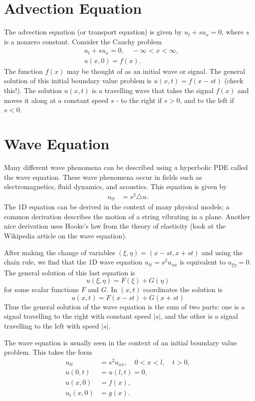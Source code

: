 \label{lab:waveeqn}

\section*{Advection Equation}
The advection equation (or transport equation) is given by $u_t + s u_x = 0$, where $s$ is a nonzero constant.  
Consider the Cauchy problem 
\begin{align*}
	& u_t + su_x = 0, \quad -\infty < x < \infty,\\\
	& u(x,0) = f(x).
\end{align*}
The function $f(x)$ may be thought of as an initial wave or signal.
The general solution of this initial boundary value problem is $u(x,t) = f(x-st)$ (check this!).
The solution $u(x,t)$ is a travelling wave that takes the signal $f(x)$ and moves it along at a constant speed $s$ - to the right if $s > 0$, and to the left if $s < 0$. 

\section*{Wave Equation}
Many different wave phenomena can be described using a hyperbolic PDE called the wave equation. 
These wave phenomena occur in fields such as electromagnetics, fluid dynamics, and acoustics. 
This equation is given by 
\begin{align}
	u_{tt} &= s^2 \triangle u.
\end{align}
The 1D equation can be derived in the context of many physical models; a common derivation describes the motion of a string vibrating in a plane.
Another nice derivation uses Hooke's law from the theory of elasticity (look at the Wikipedia article on the wave equation).

After making the change of variables $(\xi,\eta) = (x-st, x + st)$ and using the chain rule, we find that the 1D wave equation $u_{tt} = s^2 u_{xx}$ is equivalent to $u_{\xi \eta} = 0$.
The general solution of this last equation is 
\[ u(\xi, \eta) = F(\xi) + G(\eta) \]
for some scalar functions $F$ and $G$.
In $(x,t)$ coordinates the solution is 
\[u(x,t) = F(x-st) + G(x+st)\]
Thus the general solution of the wave equation is the sum of two parts: one is a signal travelling to the right with constant speed $|s|$, and the other is a signal travelling to the left with speed $|s|$.

The wave equation is usually seen in the context of an initial boundary value problem. 
This takes the form
\begin{align*}
	u_{tt} &= s^2 u_{xx}, \quad 0 < x < l, \quad t > 0,\\
	u(0,t) &= u(l,t) = 0, \\
	u(x,0) &= f(x),\\ 
	u_t(x,0) &= g(x).
\end{align*}

